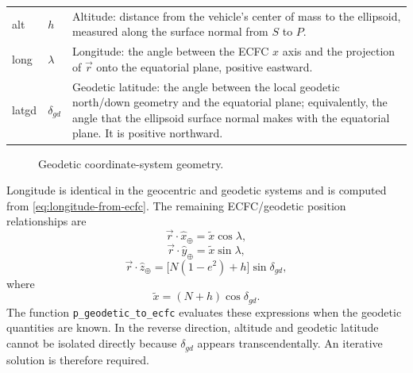 \noindent\begin{tabularx}{\textwidth}{@{}>{\ttfamily}l>{$\displaystyle}l<{$}X@{}}
  alt & h &
    Altitude: distance from the vehicle's center of mass to the ellipsoid, measured
    along the surface normal from $S$ to $P$. \\
  long & \lambda &
    Longitude: the angle between the ECFC $x$ axis and the projection of
    $\vec{r}$ onto the equatorial plane, positive eastward. \\
  latgd & \delta_{gd} &
    Geodetic latitude: the angle between the local geodetic north/down geometry
    and the equatorial plane; equivalently, the angle that the ellipsoid surface
    normal makes with the equatorial plane. It is positive northward. \\
\end{tabularx}

\begin{figure}[htbp]
  \centering
  \resizebox{0.72\linewidth}{!}{}
  \caption{Geodetic coordinate-system geometry.}
  \label{fig:geodetic-coordinate-geometry}
\end{figure}

Longitude is identical in the geocentric and geodetic systems and is computed from
\cref{eq:longitude-from-ecfc}. The remaining ECFC/geodetic position relationships
are
\begin{equation}
  \vec{r}\cdot\hat{x}_{\oplus}=\tilde{x}\cos\lambda,
  \label{eq:geodetic-position-x}
\end{equation}
\begin{equation}
  \vec{r}\cdot\hat{y}_{\oplus}=\tilde{x}\sin\lambda,
  \label{eq:geodetic-position-y}
\end{equation}
\begin{equation}
  \vec{r}\cdot\hat{z}_{\oplus}
    =\bigl[N(1-e^2)+h\bigr]\sin\delta_{gd},
  \label{eq:geodetic-position-z}
\end{equation}
where
\begin{equation}
  \tilde{x}=(N+h)\cos\delta_{gd}.
  \label{eq:geodetic-equatorial-projection}
\end{equation}
The function \texttt{p\_geodetic\_to\_ecfc} evaluates these expressions when the
geodetic quantities are known. In the reverse direction, altitude and geodetic
latitude cannot be isolated directly because $\delta_{gd}$ appears
transcendentally. An iterative solution is therefore required.

